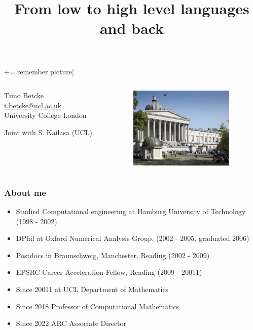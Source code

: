 \documentclass[dvipsnames,10pt]{beamer}
\title{From low to high level languages and back}
\date{}
\begin{document}
\lstset{language=Python}
+=[remember picture]
\begin{frame}

\vspace{1cm}

\titlepage
\vspace{-2cm}
\begin{columns}[T]
\begin{column}{.48\textwidth}
\begin{center}
    Timo Betcke \\
    \url{t.betcke@ucl.ac.uk}\\
    University College London
\end{center}
\begin{tcolorbox}
Joint with S. Kailasa (UCL)
\end{tcolorbox}
\end{column}%
\hfill%
\begin{column}{.48\textwidth}
\includegraphics[width=5cm]{../figs/ucl_campus}

\end{column}%
\end{columns}

\end{frame}

\begin{frame}
	\frametitle{About me}
	
	\begin{itemize}
	\item Studied Computational engineering at Hamburg University of Technology (1998 - 2002)
	\item DPhil at Oxford Numerical Analysis Group, (2002 - 2005, graduated 2006)
	\item Postdocs in Braunschweig, Manchester, Reading (2002 - 2009)
	\item EPSRC Career Acceleration Fellow, Reading (2009 - 20011)
	\item Since 20011 at UCL Department of Mathematics
	\item Since 2018 Professor of Computational Mathematics
	\item Since 2022 ARC Associate Director
	\end{itemize}
	
\end{frame}
\end{document}
